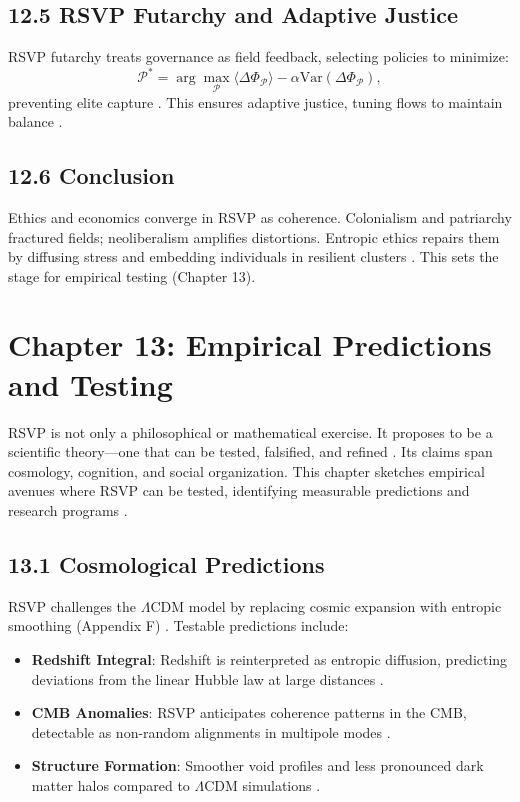 \documentclass[12pt]{article}
\begin{document}
\subsection*{12.5 RSVP Futarchy and Adaptive Justice}
RSVP futarchy treats governance as field feedback, selecting policies to minimize:
\[
\mathcal{P}^* = \arg \max_{\mathcal{P}} \langle \Delta \Phi_{\mathcal{P}} \rangle - \alpha \mathrm{Var}(\Delta \Phi_{\mathcal{P}}),
\]
preventing elite capture \citep{hanson2003}. This ensures adaptive justice, tuning flows to maintain balance \citep{whitehead1978}.
\subsection*{12.6 Conclusion}
Ethics and economics converge in RSVP as coherence. Colonialism and patriarchy fractured fields; neoliberalism amplifies distortions. Entropic ethics repairs them by diffusing stress and embedding individuals in resilient clusters \citep{deleuze1987}. This sets the stage for empirical testing (Chapter 13).
\section*{Chapter 13: Empirical Predictions and Testing}
RSVP is not only a philosophical or mathematical exercise. It proposes to be a scientific theory---one that can be tested, falsified, and refined \citep{jaynes2003}. Its claims span cosmology, cognition, and social organization. This chapter sketches empirical avenues where RSVP can be tested, identifying measurable predictions and research programs \citep{baez2011}.
\subsection*{13.1 Cosmological Predictions}
RSVP challenges the \(\Lambda\)CDM model by replacing cosmic expansion with entropic smoothing (Appendix F) \citep{whitehead1978}. Testable predictions include:
\begin{itemize}
    \item \textbf{Redshift Integral}: Redshift is reinterpreted as entropic diffusion, predicting deviations from the linear Hubble law at large distances \citep{gromov1999}.
    \item \textbf{CMB Anomalies}: RSVP anticipates coherence patterns in the CMB, detectable as non-random alignments in multipole modes \citep{baez2011}.
    \item \textbf{Structure Formation}: Smoother void profiles and less pronounced dark matter halos compared to \(\Lambda\)CDM simulations \citep{whitehead1978}.
\end{itemize}
\end{document}
